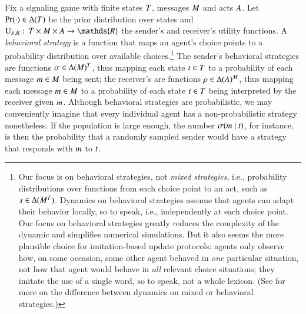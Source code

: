 \documentclass[fleqn,reqno,10pt]{article}
\begin{document}
Fix a signaling game with finite states $T$, messages $M$ and acts $A$. Let
$\Pr(\cdot) \in \Delta(T)$ be the prior distribution over states and
$\Util_{\sen,\rec} \mycolon \States \times \Messgs \times \Acts \rightarrow \mathds{R}$ the
sender's and receiver's utility functions. A \emph{behavioral strategy} is a function that maps
an agent's choice points to a probability distribution over available choices.\footnote{Our
  focus is on behavioral strategies, not \emph{mixed strategies}, i.e., probability
  distributions over functions from each choice point to an act, such as
  $s \in \Delta(M^{T})$.  Dynamics on behavioral strategies assume that agents can
  adapt their behavior locally, so to speak, i.e., independently at each choice point. Our
  focus on behavioral strategies greatly reduces the complexity of the dynamic and simplifies
  numerical simulations. But it also seems the more plausible choice for imitation-based update
  protocols: agents only observe how, on some occasion, some other agent behaved in \emph{one}
  particular situation, not how that agent would behave in \emph{all} relevant choice
  situations; they imitate the use of a single word, so to speak, not a whole lexicon. (See
  \citet{Cressman2003:Evolutionary-Dy} for more on the difference between dynamics on mixed or
  behavioral strategies.)} The sender's behavioral strategies are functions
$\sigma \in \Delta(M)^T$, thus mapping each state $t \in T$ to a
probability of each message $m \in M$ being sent; the receiver's are functions
$\rho \in \Delta(A)^M$, thus mapping each message $m \in M$ to a
probability of each state $t \in T$ being interpreted by the receiver given
$m$. Although behavioral strategies are probabilistic, we may conveniently imagine that
every individual agent has a non-probabilistic strategy nonetheless. If the population is large
enough, the number $\sigma(m \mid t)$, for instance, is then the probability
that a randomly sampled sender would have a strategy that responds with $m$ to $t$.
\end{document}
